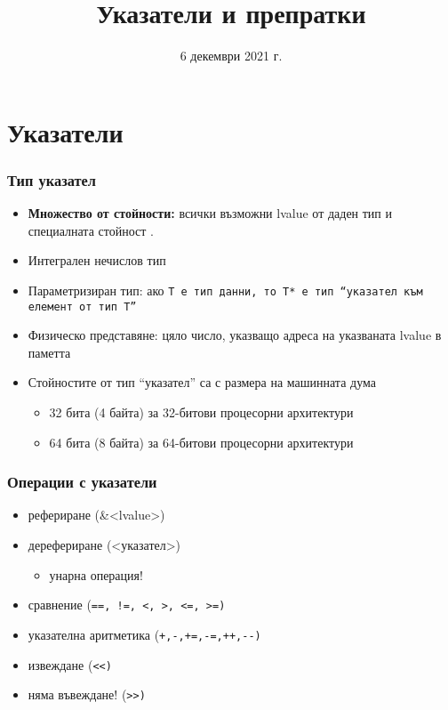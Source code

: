 \documentclass[alsotrans]{beamerswitch}
\title{Указатели и препратки}
\date{6 декември 2021 г.}
\begin{document}
\begin{frame}
  \titlepage
\end{frame}

\section{Указатели}

\begin{frame}
  \frametitle{Тип указател}

  \begin{itemize}[<+->]
  \item \textbf{Множество от стойности:} всички възможни lvalue от даден тип и специалната стойност .
  \item Интегрален \alert{нечислов} тип
  \item Параметризиран тип: ако \tt T е тип данни, то \tt{T*} е тип ``указател към елемент от тип \tt T''
  \item Физическо представяне: цяло число, указващо адреса на указваната lvalue в паметта
  \item Стойностите от тип ``указател'' са с размера на машинната дума
    \begin{itemize}
    \item 32 бита (4 байта) за 32-битови процесорни архитектури
    \item 64 бита (8 байта) за 64-битови процесорни архитектури
    \end{itemize}
  \end{itemize}
\end{frame}

\begin{frame}
  \frametitle{Операции с указатели}

  \begin{itemize}[<+->]
   \item рефериране (\tta\&<lvalue>)
   \item дерефериране (\tta*<указател>)
     \begin{itemize}[<.->]
     \item \alert{унарна операция!}
     \end{itemize}
   \item сравнение (\tt{==}, \tt{!=}, \tt{<}, \tt{>}, \tt{<=}, \tt{>=})
   \item указателна аритметика (\tt+,\tt-,\tt{+=},\tt{-=},\tt{++},\tt{-{}-})
  \item извеждане (\tt{<{}<})
  \item \alert{няма въвеждане! (\tt{>{}>})}
  \end{itemize}
\end{frame}
\end{document}
